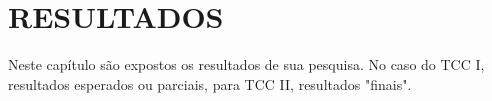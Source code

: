


\section{\textbf{RESULTADOS}}
    \label{sec:resultados}

Neste capítulo são expostos os resultados de sua pesquisa. No caso do TCC I, resultados esperados ou parciais, para TCC II, resultados "finais".

\newpage
